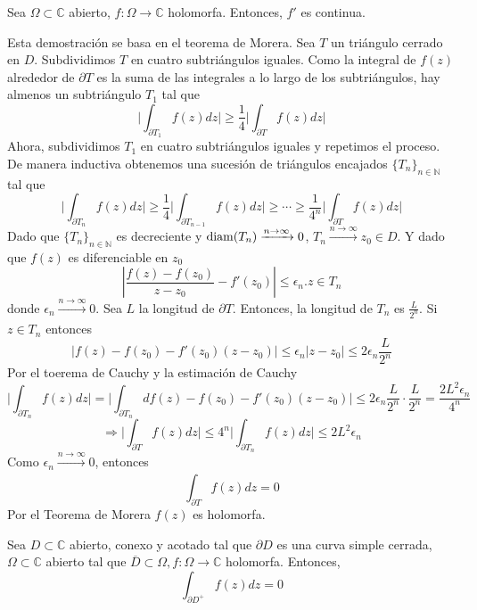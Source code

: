 \begin{theo}[Goursat]
  Sea $\Omega \subset \mathbb{C}$ abierto, $f: \Omega \to \mathbb{C}$ holomorfa. Entonces, $f'$ es continua.
\end{theo}

\begin{dem}
  Esta demostración se basa en el teorema de Morera. Sea $T$ un triángulo cerrado en $D$. Subdividimos $T$ en cuatro subtriángulos iguales. Como la integral de $f(z)$ alrededor de $\partial T$ es la suma de las integrales a lo largo de los subtriángulos, hay almenos un subtriángulo $T_{1}$ tal que
  \[ 
    \Bigg |  \int_{\partial{T_{1}}}^{} f(z) dz \Bigg | \geq \frac{1}{4} \Bigg | \int_{\partial{ T}}^{} f(z) dz \Bigg |
  \] 
  Ahora, subdividimos $T_{1}$ en cuatro subtriángulos iguales y repetimos el proceso. De manera inductiva obtenemos una sucesión de triángulos encajados $\{ T_{n} \}_{n \in \mathbb{N}}$ tal que
  \[ 
    \Bigg |  \int_{\partial{T_{n}}}^{} f(z) dz \Bigg | \geq \frac{1}{4} \Bigg | \int_{\partial{T_{n-1}}}^{} f(z) dz \Bigg | \geq \cdots \geq \frac{1}{4^{n}} \Bigg | \int_{\partial{T}}^{} f(z) dz \Bigg |
  \] 
  Dado que $\{ T_{n} \}_{n \in \mathbb{N}}$ es decreciente y $\operatorname{diam}(T_{n}) \xrightarrow[]{ n \rightarrow \infty } 0$, $T_{n} \xrightarrow[]{ n \rightarrow \infty } z_{0} \in D$. Y dado que $ f(z)$ es diferenciable en $z_{0}$
  \[ 
    | \frac{f(z) - f(z_{0})}{z - z_{0}} - f'(z_{0}) | \leq \epsilon_{n}. z \in T_{n} 
  \] 
  donde $\epsilon_{n} \xrightarrow[]{ n \rightarrow \infty } 0$. Sea $L$ la longitud de $\partial{ T}$. Entonces, la longitud de $T_{n}$ es $\frac{L}{2^{n}}$. Si $z \in T_{n}$ entonces
  \[ 
    | f(z) - f(z_{0}) - f'(z_{0})(z-z_{0}) | \leq \epsilon_{n} | z - z_{0} | \leq 2 \epsilon_{n} \frac{L}{2^n} 
  \] 
  Por el toerema de Cauchy y la estimación de Cauchy
  \[ 
    \Big | \int_{\partial{T_{n}}}^{} f(z) dz \Big | = \Big | \int_{\partial{T_{n}}}^{}  d f(z) - f(z_{0}) - f'(z_{0})(z-z_{0}) \Big | \leq 2 \epsilon_{n} \frac{L}{2^n} \cdot \frac{L}{2^{n}} = \frac{2L^{2} \epsilon_{n}}{4^{n}}
  \] 
  \[ 
    \Rightarrow \Big | \int_{\partial{T}}^{} f(z) dz \Big | \leq 4^{n} \Big | \int_{\partial{T_{n}}}^{} f(z) dz \Big |  \leq 2 L^{2} \epsilon_{n}
  \] 
  Como $\epsilon_{n} \xrightarrow[]{ n \rightarrow \infty } 0$, entonces
  \[ 
    \int_{\partial{T}}^{} f(z) dz = 0 
  \] 
  Por el Teorema de Morera $f(z)$ es holomorfa.
\end{dem}

\begin{theo}
  Sea $D \subset \mathbb{C}$ abierto, conexo y acotado tal que $\partial D$ es una curva simple cerrada, $\Omega \subset \mathbb{C}$ abierto tal que $\overline{D} \subset \Omega, f: \Omega \to \mathbb{C}$ holomorfa. Entonces, 
  \[ 
    \int_{\partial D^+}^{} f(z) dz = 0 
  \] 
\end{theo}

